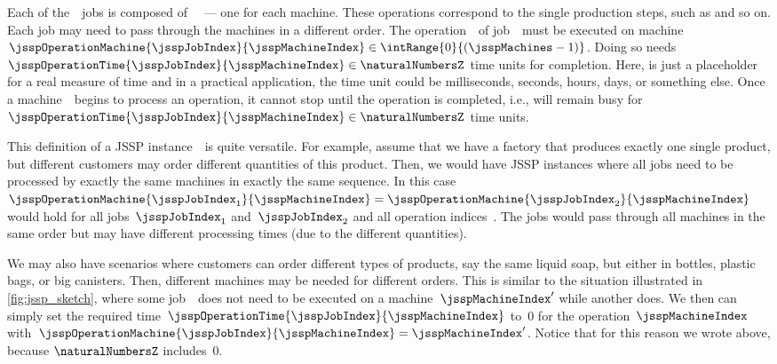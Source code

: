 Each of the~\jsspJobs\ jobs is composed of~\jsspMachines\  --- one for each machine.
These operations correspond to the single production steps, such as   and so on.
Each job may need to pass through the machines in a different order.
The operation~\jsspMachineIndex\ of job~\jsspJobIndex\ must be executed on machine~$\jsspOperationMachine{\jsspJobIndex}{\jsspMachineIndex}\in \intRange{0}{(\jsspMachines-1)}$.
Doing so needs~$\jsspOperationTime{\jsspJobIndex}{\jsspMachineIndex}\in\naturalNumbersZ$ time units for completion.
Here,  is just a placeholder for a real measure of time and in a practical application, the time unit could be milliseconds, seconds, hours, days, or something else.
Once a machine~\jsspMachineIndex\ begins to process an operation, it cannot stop until the operation is completed, i.e., will remain busy for~$\jsspOperationTime{\jsspJobIndex}{\jsspMachineIndex}\in\naturalNumbersZ$ time units.

This definition of a \gls{JSSP} instance~\instance\ is quite versatile.
For example, assume that we have a factory that produces exactly one single product, but different customers may order different quantities of this product.
Then, we would have \gls{JSSP} instances where all jobs need to be processed by exactly the same machines in exactly the same sequence.
In this case~$\jsspOperationMachine{\jsspJobIndex_1}{\jsspMachineIndex}=\jsspOperationMachine{\jsspJobIndex_2}{\jsspMachineIndex}$ would hold for all jobs~$\jsspJobIndex_1$ and~$\jsspJobIndex_2$ and all operation indices~\jsspMachineIndex.
The jobs would pass through all machines in the same order but may have different processing times (due to the different quantities).

We may also have scenarios where customers can order different types of products, say the same liquid soap, but either in bottles, plastic bags, or big canisters.
Then, different machines may be needed for different orders.
This is similar to the situation illustrated in \autoref{fig:jssp_sketch}, where some job~\jsspJobIndex\ does not need to be executed on a machine~$\jsspMachineIndex'$ while another does.
We then can simply set the required time~$\jsspOperationTime{\jsspJobIndex}{\jsspMachineIndex}$ to~0 for the operation~$\jsspMachineIndex$ with~$\jsspOperationMachine{\jsspJobIndex}{\jsspMachineIndex}=\jsspMachineIndex'$.
Notice that for this reason we wrote \inQuotes{$\jsspOperationTime{\jsspJobIndex}{\jsspMachineIndex}\in\naturalNumbersZ$} above, because $\naturalNumbersZ$ includes~0.

